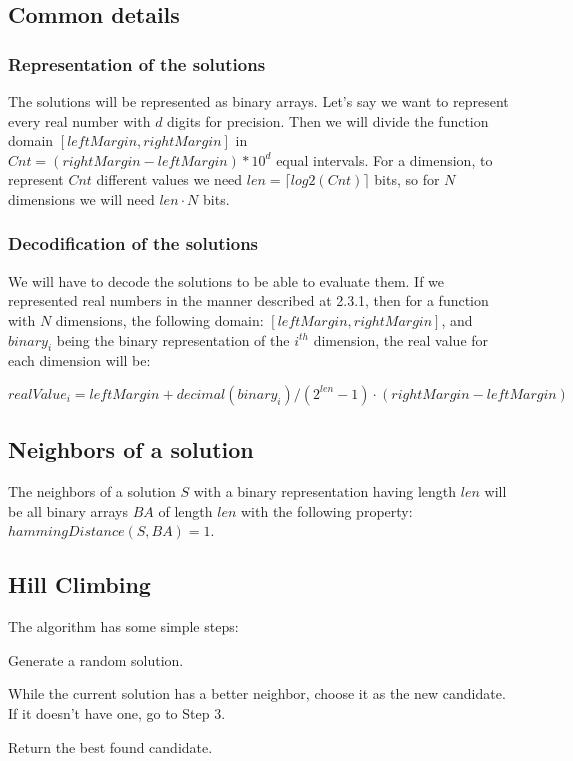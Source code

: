 \documentclass[a4paper]{article}
\begin{document}
\subsection{Common details}

\subsubsection{Representation of the solutions}

The solutions will be represented as binary arrays. Let's say we want to represent every real number with $d$ digits for precision. Then we will divide the function domain $\left[leftMargin, rightMargin\right]$ in $Cnt=(rightMargin-leftMargin)*10^d$ equal intervals. For a dimension, to represent $Cnt$ different values we need $len=\lceil log2(Cnt)\rceil$ bits, so for $N$ dimensions we will need $len \cdot N$ bits.

\subsubsection{Decodification of the solutions}

We will have to decode the solutions to be able to evaluate them. If we represented real numbers in the manner described at 2.3.1, then for a function with $N$ dimensions, the following domain: $\left[leftMargin, rightMargin\right]$, and $binary_i$ being the binary representation of the $i^{th}$ dimension, the real value for each dimension will be:

$$ realValue_i = leftMargin+decimal(binary_i)/(2^{len}-1) \cdot (rightMargin - leftMargin) $$

\subsection{Neighbors of a solution}

The neighbors of a solution $S$ with a binary representation having length $len$ will be all binary arrays $BA$ of length $len$ with the following property: $hammingDistance(S, BA)=1$.

\subsection{Hill Climbing}

The algorithm has some simple steps:

\begin{steps}
	\item Generate a random solution.
	\item While the current solution has a better neighbor, choose it as the new candidate. If it doesn't have one, go to Step 3.
	\item Return the best found candidate.
\end{steps}
\end{document}
